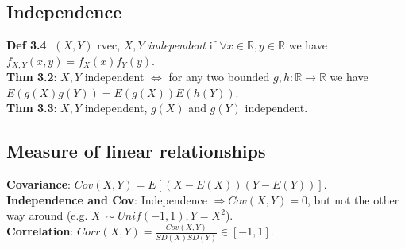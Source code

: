 \subsection{Independence}
\textbf{Def 3.4}: $(X,Y)$ rvec, $X,Y$ \textit{independent} if $\forall x\in \mathbb{R}, y\in\mathbb{R}$ we have $f_{X,Y}(x,y) = f_X(x)f_Y(y)$.\\
\textbf{Thm 3.2}: $X,Y$ independent $\Leftrightarrow$ for any two bounded $g,h:\mathbb{R}\to\mathbb{R}$ we have $E(g(X)g(Y)) = E(g(X))E(h(Y))$.\\
\textbf{Thm 3.3}: $X,Y$ independent, $g(X)$ and $g(Y)$ independent.\\

\subsection{Measure of linear relationships}
\textbf{Covariance}: $Cov(X,Y) = E[(X-E(X))(Y-E(Y))]$.\\
\textbf{Independence and Cov}: Independence $\Rightarrow Cov(X,Y) = 0$, but not the other way around (e.g. $X~\sim Unif(-1,1), Y=X^2$).\\
\textbf{Correlation}: $Corr(X,Y) = \frac{Cov(X,Y)}{SD(X)SD(Y)} \in [-1,1]$.\\
 


